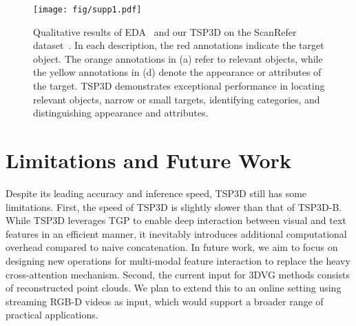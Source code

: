 \begin{figure*}[t]
	\centering
	\texttt{[image: fig/supp1.pdf]}
    \caption{Qualitative results of EDA~\citep{wu2023eda} and our TSP3D on the ScanRefer dataset~\citep{chen2020scanrefer}. In each description, the red annotations indicate the target object. The orange annotations in (a) refer to relevant objects, while the yellow annotations in (d) denote the appearance or attributes of the target. TSP3D demonstrates exceptional performance in locating relevant objects, narrow or small targets, identifying categories, and distinguishing appearance and attributes.}
	\label{fig:supp}
\end{figure*}

\section{Limitations and Future Work}\label{sec:supp5}
Despite its leading accuracy and inference speed, TSP3D still has some limitations. First, the speed of TSP3D is slightly slower than that of TSP3D-B. While TSP3D leverages TGP to enable deep interaction between visual and text features in an efficient manner, it inevitably introduces additional computational overhead compared to naive concatenation. In future work, we aim to focus on designing new operations for multi-modal feature interaction to replace the heavy cross-attention mechanism. Second, the current input for 3DVG methods consists of reconstructed point clouds. We plan to extend this to an online setting using streaming RGB-D videos as input, which would support a broader range of practical applications.




